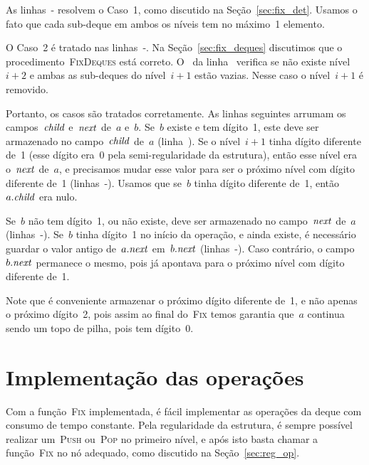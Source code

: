 \documentclass[../../main.tex]{subfiles}
\begin{document}
As linhas~{-} resolvem o Caso~1, como discutido na Seção~\ref{sec:fix_det}. Usamos o fato que cada sub-deque em ambos os níveis tem no máximo~1 elemento.

O Caso~2 é tratado nas linhas~{-}. Na Seção~\ref{sec:fix_deques} discutimos que o procedimento~\textsc{FixDeques} está correto. O~ da linha~ verifica se não existe nível~$i+2$ e ambas as sub-deques do nível~$i+1$ estão vazias. Nesse caso o nível~$i+1$ é removido.

Portanto, os casos são tratados corretamente. As linhas seguintes arrumam os campos~$\mathit{child}$ e~$\mathit{next}$ de~$a$ e~$b$. Se~$b$ existe e tem dígito~1, este deve ser armazenado no campo~$\mathit{child}$ de~$a$ (linha~). Se o nível~$i+1$ tinha dígito diferente de~1 (esse dígito era~0 pela semi-regularidade da estrutura), então esse nível era o~$\mathit{next}$ de~$a$, e precisamos mudar esse valor para ser o próximo nível com dígito diferente de~1 (linhas~-). Usamos que se~$b$ tinha dígito diferente de~1, então~$a.\mathit{child}$ era nulo.

Se~$b$ não tem dígito~1, ou não existe, deve ser armazenado no campo~$\mathit{next}$ de~$a$ (linhas~-).
Se~$b$ tinha dígito~1 no início da operação, e ainda existe, é necessário guardar o valor antigo de~$a.\mathit{next}$ em~$b.\mathit{next}$ (linhas~-). Caso contrário, o campo~$b.\mathit{next}$ permanece o mesmo, pois já apontava para o próximo nível com dígito diferente de~1.

Note que é conveniente armazenar o próximo dígito diferente de~1, e não apenas o próximo dígito~2, pois assim ao final do~\textsc{Fix} temos garantia que~$a$ continua sendo um topo de pilha, pois tem dígito~0.

\section{Implementação das operações}

Com a função~\textsc{Fix} implementada, é fácil implementar as operações da deque com consumo de tempo constante. Pela regularidade da estrutura, é sempre possível realizar um~\textsc{Push} ou~\textsc{Pop} no primeiro nível, e após isto basta chamar a função~\textsc{Fix} no nó adequado, como discutido na Seção~\ref{sec:reg_op}.
\end{document}
